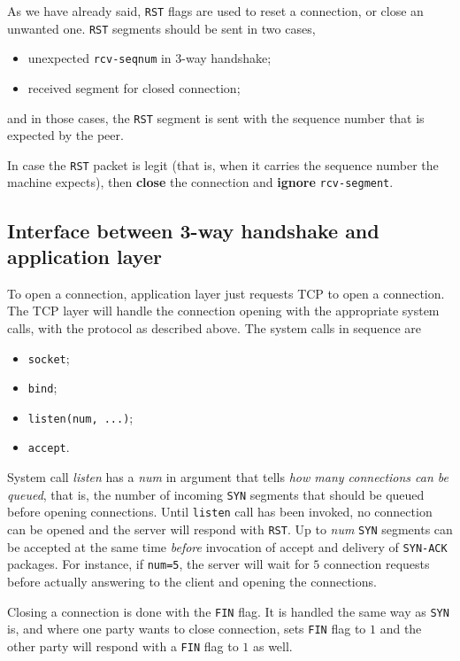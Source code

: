 \documentclass[10pt]{extreport}
\begin{document}
As we have already said, \texttt{RST} flags are used to reset a connection, or
close an unwanted one. \texttt{RST} segments should be sent in two cases,
\begin{itemize}
    \item unexpected \texttt{rcv-seqnum} in 3-way handshake;
    \item received segment for closed connection;
\end{itemize}
and in those cases, the \texttt{RST} segment is sent with the sequence number that is
expected by the peer.

In case the \texttt{RST} packet is legit (that is, when it carries the sequence number
the machine expects), then \textbf{close} the connection and \textbf{ignore}
\texttt{rcv-segment}.

\subsection{Interface between 3-way handshake and application layer}

To open a connection, application layer just requests TCP to open a connection.
The TCP layer will handle the connection opening with the appropriate system
calls, with the protocol as described above.
The system calls in sequence are

\begin{itemize}
	\item \texttt{socket};
    \item \texttt{bind};
    \item \texttt{listen(num, ...)};
    \item \texttt{accept}.
\end{itemize}

System call \emph{listen} has a \emph{num} in argument that tells \emph{how many
connections can be queued}, that is, the number of incoming \texttt{SYN} segments that
should be queued before opening connections. Until \texttt{listen} call has
been invoked, no connection can be opened and the server will respond with
\texttt{RST}. Up to \emph{num} \texttt{SYN} segments can be accepted at the
same time \emph{before} invocation of accept and delivery of \texttt{SYN-ACK}
packages. For instance, if \texttt{num=5}, the server will wait for $5$
connection requests before actually answering to the client and opening the
connections.

Closing a connection is done with the \texttt{FIN} flag. It is handled the same
way as \texttt{SYN} is, and where one party wants to close connection, sets
\texttt{FIN} flag to $1$ and the other party will respond with a \texttt{FIN}
flag to $1$ as well.
\end{document}
